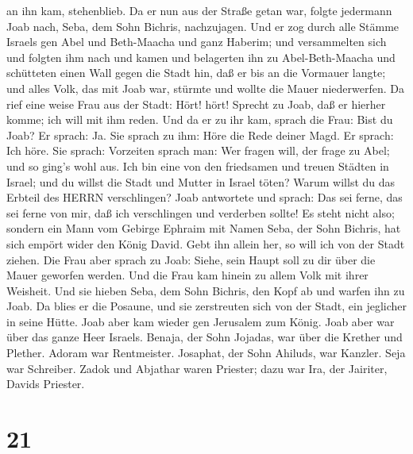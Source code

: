 an ihn kam, stehenblieb.  Da er nun aus der Straße getan
war, folgte jedermann Joab nach, Seba, dem Sohn Bichris, nachzujagen.
 Und er zog durch alle Stämme Israels gen Abel und
Beth-Maacha und ganz Haberim; und versammelten sich und folgten ihm nach
 und kamen und belagerten ihn zu Abel-Beth-Maacha und
schütteten einen Wall gegen die Stadt hin, daß er bis an die Vormauer
langte; und alles Volk, das mit Joab war, stürmte und wollte die Mauer
niederwerfen.  Da rief eine weise Frau aus der Stadt: Hört!
hört! Sprecht zu Joab, daß er hierher komme; ich will mit ihm reden.
 Und da er zu ihr kam, sprach die Frau: Bist du Joab? Er
sprach: Ja. Sie sprach zu ihm: Höre die Rede deiner Magd. Er sprach: Ich
höre.  Sie sprach: Vorzeiten sprach man: Wer fragen will,
der frage zu Abel; und so ging's wohl aus.  Ich bin eine
von den friedsamen und treuen Städten in Israel; und du willst die Stadt
und Mutter in Israel töten? Warum willst du das Erbteil des HERRN
verschlingen?  Joab antwortete und sprach: Das sei ferne,
das sei ferne von mir, daß ich verschlingen und verderben sollte! Es
steht nicht also;  sondern ein Mann vom Gebirge Ephraim mit
Namen Seba, der Sohn Bichris, hat sich empört wider den König David.
Gebt ihn allein her, so will ich von der Stadt ziehen. Die Frau aber
sprach zu Joab: Siehe, sein Haupt soll zu dir über die Mauer geworfen
werden.  Und die Frau kam hinein zu allem Volk mit ihrer
Weisheit. Und sie hieben Seba, dem Sohn Bichris, den Kopf ab und warfen
ihn zu Joab. Da blies er die Posaune, und sie zerstreuten sich von der
Stadt, ein jeglicher in seine Hütte. Joab aber kam wieder gen Jerusalem
zum König.  Joab aber war über das ganze Heer Israels.
Benaja, der Sohn Jojadas, war über die Krether und Plether.
 Adoram war Rentmeister. Josaphat, der Sohn Ahiluds, war
Kanzler.  Seja war Schreiber. Zadok und Abjathar waren
Priester;  dazu war Ira, der Jairiter, Davids Priester.

\hypertarget{section-20}{%
\section{21}\label{section-20}}

